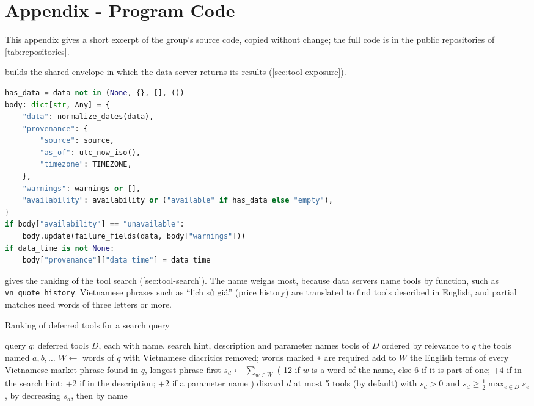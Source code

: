 \Appendices

\section{Appendix - Program Code}\label{sec:app-code}
This appendix gives a short excerpt of the group's source code, copied without change; the full code is in the public repositories of \cref{tab:repositories}.

 builds the shared envelope in which the data server returns its results (\cref{sec:tool-exposure}).

\begin{lstlisting}[language=Python,caption={The shared answer envelope, from opentrading-mcp \parencite{group2026opentradingmcp}},label={lst:envelope},breakatwhitespace=true]
has_data = data not in (None, {}, [], ())
body: dict[str, Any] = {
    "data": normalize_dates(data),
    "provenance": {
        "source": source,
        "as_of": utc_now_iso(),
        "timezone": TIMEZONE,
    },
    "warnings": warnings or [],
    "availability": availability or ("available" if has_data else "empty"),
}
if body["availability"] == "unavailable":
    body.update(failure_fields(data, body["warnings"]))
if data_time is not None:
    body["provenance"]["data_time"] = data_time
\end{lstlisting}

 gives the ranking of the tool search (\cref{sec:tool-search}).
The name weighs most, because data servers name tools by function, such as \texttt{vn\_quote\_history}.
Vietnamese phrases such as \enquote{lịch sử giá} (price history) are translated to find tools described in English, and partial matches need words of three letters or more.

\begin{algorithm}[H]
  \caption{Ranking of deferred tools for a search query}\label{alg:tool-search}
  \begin{algorithmic}[1]
    \Require query $q$; deferred tools $D$, each with name, search hint, description and parameter names
    \Ensure tools of $D$ ordered by relevance to $q$
     \State \Return the tools named $a,b,\dots$ \EndIf
    \State $W \gets$ words of $q$ with Vietnamese diacritics removed; words marked \texttt{+} are required
    \State add to $W$ the English terms of every Vietnamese market phrase found in $q$, longest phrase first
      \State $s_d \gets \sum_{w \in W}$ ( 12 if $w$ is a word of the name, else 6 if it is part of one;
      \Statex \hspace{\algorithmicindent}\hspace{\algorithmicindent} $+4$ if in the search hint; $+2$ if in the description; $+2$ if a parameter name )
       \State discard $d$ \EndIf
    \EndFor
    \State \Return at most 5 tools (by default) with $s_d>0$ and $s_d \ge \tfrac{1}{2}\max_{e\in D} s_e$, by decreasing $s_d$, then by name
  \end{algorithmic}
\end{algorithm}

